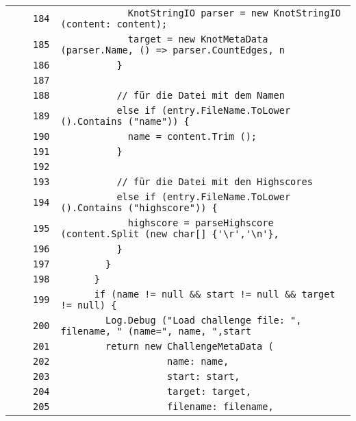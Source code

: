 \documentclass[a4paper,10pt]{article}
\begin{document}
\begin{longtable}[l]{lrrl}
\cellcolor{gray} &  & \verb~184~ & \verb~            KnotStringIO parser = new KnotStringIO (content: content);~\\
\cellcolor{gray} &  & \verb~185~ & \verb~            target = new KnotMetaData (parser.Name, () => parser.CountEdges, n~\\
\cellcolor{gray} &  & \verb~186~ & \verb~          }~\\
\cellcolor{gray} &  & \verb~187~ & \verb~~\\
\cellcolor{gray} &  & \verb~188~ & \verb~          // für die Datei mit dem Namen~\\
\cellcolor{gray} &  & \verb~189~ & \verb~          else if (entry.FileName.ToLower ().Contains ("name")) {~\\
\cellcolor{gray} &  & \verb~190~ & \verb~            name = content.Trim ();~\\
\cellcolor{gray} &  & \verb~191~ & \verb~          }~\\
\cellcolor{gray} &  & \verb~192~ & \verb~~\\
\cellcolor{gray} &  & \verb~193~ & \verb~          // für die Datei mit den Highscores~\\
\cellcolor{gray} &  & \verb~194~ & \verb~          else if (entry.FileName.ToLower ().Contains ("highscore")) {~\\
\cellcolor{gray} &  & \verb~195~ & \verb~            highscore = parseHighscore (content.Split (new char[] {'\r','\n'},~\\
\cellcolor{gray} &  & \verb~196~ & \verb~          }~\\
\cellcolor{gray} &  & \verb~197~ & \verb~        }~\\
\cellcolor{gray} &  & \verb~198~ & \verb~      }~\\
\cellcolor{gray} &  & \verb~199~ & \verb~      if (name != null && start != null && target != null) {~\\
\cellcolor{gray} &  & \verb~200~ & \verb~        Log.Debug ("Load challenge file: ", filename, " (name=", name, ",start~\\
\cellcolor{gray} &  & \verb~201~ & \verb~        return new ChallengeMetaData (~\\
\cellcolor{gray} &  & \verb~202~ & \verb~                   name: name,~\\
\cellcolor{gray} &  & \verb~203~ & \verb~                   start: start,~\\
\cellcolor{gray} &  & \verb~204~ & \verb~                   target: target,~\\
\cellcolor{gray} &  & \verb~205~ & \verb~                   filename: filename,~\\

\end{longtable}
\end{document}
